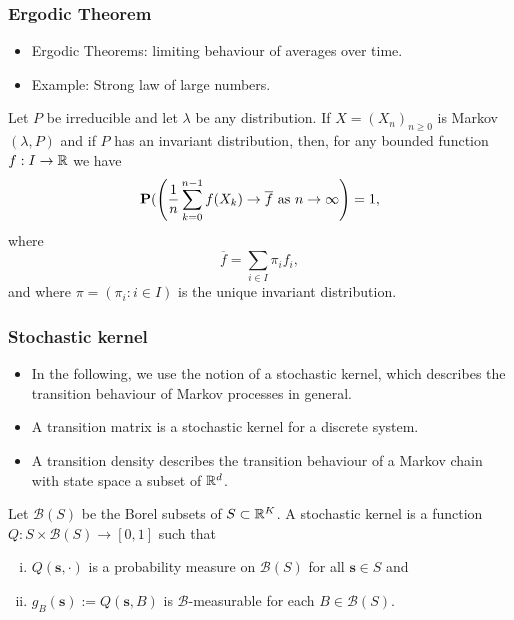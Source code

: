 \documentclass[xcolor=table,10pt]{beamer}
\begin{document}
\begin{frame}
  \frametitle{Ergodic Theorem}
  \begin{itemize}
\item \alert{Ergodic Theorems}: limiting behaviour of
  averages over time.
\item Example: Strong law of large numbers. 
\end{itemize}
\begin{theorem}
  Let $P$ be irreducible and let $\lambda$ be any distribution. If
  $X=(X_n)_{n\geq 0}$ is Markov$(\lambda, P)$ and if $P$ has an
  invariant distribution, %
  then, for any bounded function $f:I\rightarrow{\mathbb{R}}$
  we have
  \begin{equation*}
    {\bf P}(\left(\frac{1}{n} \sum_{k=0}^{n-1} f(X_k)\rightarrow\overline
      f\text{ as }n\rightarrow \infty\right)=1,
  \end{equation*}
  where
  \begin{equation*}
    \overline f = \sum_{i\in I} \pi_i f_i,
  \end{equation*}
  and where $\pi = (\pi_i:i\in I)$ is the unique invariant
  distribution.
\end{theorem}
\end{frame}

\begin{frame}
  \frametitle{Stochastic kernel}
  \begin{itemize}
    \item In the following, we use the notion of a \alert{stochastic
        kernel}, which describes the transition behaviour of Markov
      processes in general. 
    \item A transition matrix is a stochastic kernel for a discrete
      system. 
    \item A \alert{transition density} describes the transition
      behaviour of a Markov chain with state space a subset of ${\mathbb{R}}^d$.  
    \end{itemize}
      \begin{definition}
    Let $\mathcal B(S)$ be the Borel subsets of $S\subset {\mathbb{R}}^K$. A
    \alert{stochastic kernel} is a function
    $Q:S\times \mathcal B(S)\rightarrow [0,1]$ such that
    \begin{enumerate}[(i)]
    \item $Q(\bm s,\cdot)$ is a probability measure on
      $\mathcal B(S)$ for all $\bm s\in S$ and
    \item $g_B(\bm s) := Q(\bm s,B)$ is $\mathcal B$-measurable for
      each $B\in \mathcal B(S)$.
    \end{enumerate}
  \end{definition}
\end{frame}
\end{document}
